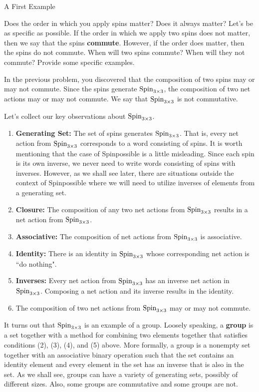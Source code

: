 \begin{section}{A First Example}
\begin{problem}
Does the order in which you apply spins matter?  Does it always matter?  Let's be as specific as possible.  If the order in which we apply two spins does not matter, then we say that the spins \textbf{commute}.  However, if the order does matter, then the spins do not commute.  When will two spins commute?  When will they not commute?  Provide some specific examples.
\end{problem}

In the previous problem, you discovered that the composition of two spins may or may not commute.  Since the spins generate $\operatorname{Spin}_{3\times 3}$, the composition of two net actions may or may not commute.  We say that $\operatorname{Spin}_{3\times 3}$ is not commutative.

Let's collect our key observations about $\operatorname{Spin}_{3\times 3}$.
\begin{enumerate}[label=\rm{(\arabic*)}]
\item \textbf{Generating Set:} The set of spins generates $\operatorname{Spin}_{3\times 3}$.  That is, every net action from $\operatorname{Spin}_{3\times 3}$ corresponds to a word consisting of spins. It is worth mentioning that the case of Spinpossible is a little misleading. Since each spin is its own inverse, we never need to write words consisting of spins with inverses. However, as we shall see later, there are situations outside the context of Spinpossible where we will need to utilize inverses of elements from a generating set. 
\item \textbf{Closure:} The composition of any two net actions from $\operatorname{Spin}_{3\times 3}$ results in a net action from $\operatorname{Spin}_{3\times 3}$.
\item \textbf{Associative:} The composition of net actions from $\operatorname{Spin}_{3\times 3}$ is associative.
\item \textbf{Identity:} There is an identity in $\operatorname{Spin}_{3\times 3}$ whose corresponding net action is ``do nothing".
\item \textbf{Inverses:} Every net action from $\operatorname{Spin}_{3\times 3}$ has an inverse net action in $\operatorname{Spin}_{3\times 3}$. Composing a net action and its inverse results in the identity.
\item The composition of two net actions from $\operatorname{Spin}_{3\times 3}$ may or may not commute.
\end{enumerate}

It turns out that $\operatorname{Spin}_{3\times 3}$ is an example of a group. Loosely speaking, a \textbf{group} is a set together with a method for combining two elements together that satisfies conditions (2), (3), (4), and (5) above.  More formally, a group is a nonempty set together with an associative binary operation such that the set contains an identity element and every element in the set has an inverse that is also in the set.  As we shall see, groups can have a variety of generating sets, possibly of different sizes. Also, some groups are commutative and some groups are not.


\end{section}
